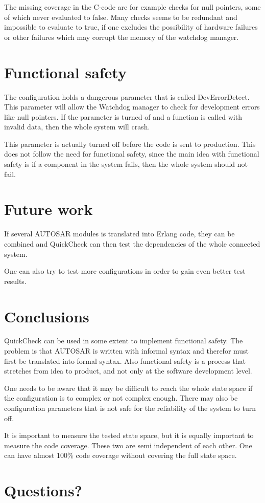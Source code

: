 \documentclass[a4paper]{article}
\begin{document}
The missing coverage in the C-code are for example checks for null
pointers, some of which never evaluated to false. Many checks seems to be
redundant and impossible to evaluate to true, if one excludes the possibility
of hardware failures or other failures which may corrupt the memory of the
watchdog manager.

\section{Functional safety}
The configuration holds a dangerous parameter that is called
DevErrorDetect. This parameter will allow the Watchdog manager to
check for development errors like null pointers. If the parameter is
turned of and a function is called with invalid data, then the whole
system will crash.

This parameter is actually turned off before the code is sent to
production. This does not follow the need for functional safety, since
the main idea with functional safety is if a component in the system
fails, then the whole system should not fail.

\section{Future work}
If several AUTOSAR modules is translated into Erlang code, they can be
combined and QuickCheck can then test the dependencies of the whole
connected system.

One can also try to test more configurations in order to gain even
better test results.

\section{Conclusions}
QuickCheck can be used in some extent to implement functional
safety. The problem is that AUTOSAR is written with informal syntax
and therefor must first be translated into formal syntax. Also
functional safety is a process that stretches from idea to product,
and not only at the software development level.

One needs to be aware that it may be difficult to reach the whole
state space if the configuration is to complex or not complex
enough. There may also be configuration parameters that is not safe
for the reliability of the system to turn off.

It is important to measure the tested state space, but it is equally
important to measure the code coverage. These two are semi independent
of each other. One can have almost 100\% code coverage without covering
the full state space.

\section{Questions?}
\end{document}
